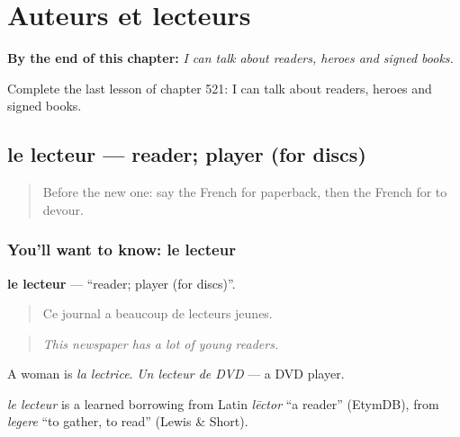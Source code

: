 
\chapter{Auteurs et lecteurs}
\label{ch:fr-auteurs-et-lecteurs}

\begin{chapteropening}
\textbf{By the end of this chapter:} \emph{I can talk about readers, heroes and signed books.}

Complete the last lesson of chapter 521: I can talk about readers, heroes and signed books.
\end{chapteropening}

\section[le lecteur]{le lecteur — reader; player (for discs)}

\label{lesson:FR-C521-lecteur}



\begin{quote}
Before the new one: say the French for paperback, then the French for to devour.
\end{quote}

\subsection*{You'll want to know: le lecteur}
\textbf{le lecteur} — \textquotedblleft{}reader; player (for discs)\textquotedblright{}.

\begin{quote}
Ce journal a beaucoup de lecteurs jeunes.
\end{quote}

\begin{quote}
\emph{This newspaper has a lot of young readers.}
\end{quote}

A woman is \emph{la lectrice}. \emph{Un lecteur de DVD} — a DVD player.

\begin{cousinweb}
\emph{le lecteur} is a learned borrowing from Latin \emph{lēctor} \textquotedblleft{}a reader\textquotedblright{} (EtymDB), from \emph{legere} \textquotedblleft{}to gather, to read\textquotedblright{} (Lewis \& Short).
\end{cousinweb}

